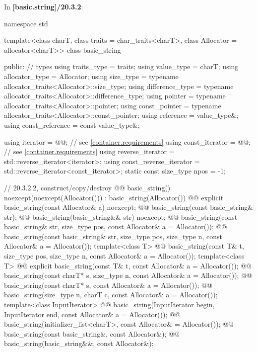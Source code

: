 \documentclass{wg21}
\begin{document}
In \textbf{[basic.string]/20.3.2}:
\begin{codeblock}
namespace std {
  template<class charT, class traits = char_traits<charT>,
           class Allocator = allocator<charT>>
  class basic_string {
  public:
    // types
    using traits_type            = traits;
    using value_type             = charT;
    using allocator_type         = Allocator;
    using size_type              = typename allocator_traits<Allocator>::size_type;
    using difference_type        = typename allocator_traits<Allocator>::difference_type;
    using pointer                = typename allocator_traits<Allocator>::pointer;
    using const_pointer          = typename allocator_traits<Allocator>::const_pointer;
    using reference              = value_type&;
    using const_reference        = const value_type&;

    using iterator               = @@; // see \ref{container.requirements}
    using const_iterator         = @@; // see \ref{container.requirements}
    using reverse_iterator       = std::reverse_iterator<iterator>;
    using const_reverse_iterator = std::reverse_iterator<const_iterator>;
    static const size_type npos  = -1;

    // 20.3.2.2, construct/copy/destroy
    @@ basic_string() noexcept(noexcept(Allocator())) : basic_string(Allocator()) { }
    @@ explicit basic_string(const Allocator& a) noexcept;
    @@ basic_string(const basic_string& str);
    @@ basic_string(basic_string&& str) noexcept;
    @@ basic_string(const basic_string& str, size_type pos, const Allocator& a = Allocator());
    @@ basic_string(const basic_string& str, size_type pos, size_type n,
                                     const Allocator& a = Allocator());
    template<class T>
      @@ basic_string(const T& t, size_type pos, size_type n, const Allocator& a = Allocator());
    template<class T>
      @@ explicit basic_string(const T& t, const Allocator& a = Allocator());
    @@ basic_string(const charT* s, size_type n, const Allocator& a = Allocator());
    @@ basic_string(const charT* s, const Allocator& a = Allocator());
    @@ basic_string(size_type n, charT c, const Allocator& a = Allocator());
    template<class InputIterator>
      @@ basic_string(InputIterator begin, InputIterator end, const Allocator& a = Allocator());
    @@ basic_string(initializer_list<charT>, const Allocator& = Allocator());
    @@ basic_string(const basic_string&, const Allocator&);
    @@ basic_string(basic_string&&, const Allocator&);

}}
\end{codeblock}
\end{document}

